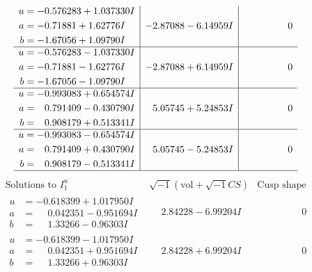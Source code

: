 \documentclass[1p]{elsarticle_modified}
\theoremstyle{definition}
\newcommand{\I}{\sqrt{-1}}
\begin{document}
$$\begin{array}{c|c|c}
\begin{aligned}
u &= -0.576283 + 1.037330 I \\
a &= -0.71881 + 1.62776 I \\
b &= -1.67056 + 1.09790 I\end{aligned}
 & -2.87088 - 6.14959 I & \phantom{-0.000000 } 0 \\ \hline\begin{aligned}
u &= -0.576283 - 1.037330 I \\
a &= -0.71881 - 1.62776 I \\
b &= -1.67056 - 1.09790 I\end{aligned}
 & -2.87088 + 6.14959 I & \phantom{-0.000000 } 0 \\ \hline\begin{aligned}
u &= -0.993083 + 0.654574 I \\
a &= \phantom{-}0.791409 - 0.430790 I \\
b &= \phantom{-}0.908179 + 0.513341 I\end{aligned}
 & \phantom{-}5.05745 + 5.24853 I & \phantom{-0.000000 } 0 \\ \hline\begin{aligned}
u &= -0.993083 - 0.654574 I \\
a &= \phantom{-}0.791409 + 0.430790 I \\
b &= \phantom{-}0.908179 - 0.513341 I\end{aligned}
 & \phantom{-}5.05745 - 5.24853 I & \phantom{-0.000000 } 0\\
 \hline 
 \end{array}$$\newpage$$\begin{array}{c|c|c}  
\text{Solutions to }I^u_{1}& \I (\text{vol} + \sqrt{-1}CS) & \text{Cusp shape}\\
 \hline 
\begin{aligned}
u &= -0.618399 + 1.017950 I \\
a &= \phantom{-}0.042351 - 0.951694 I \\
b &= \phantom{-}1.33266 - 0.96303 I\end{aligned}
 & \phantom{-}2.84228 - 6.99204 I & \phantom{-0.000000 } 0 \\ \hline\begin{aligned}
u &= -0.618399 - 1.017950 I \\
a &= \phantom{-}0.042351 + 0.951694 I \\
b &= \phantom{-}1.33266 + 0.96303 I\end{aligned}
 & \phantom{-}2.84228 + 6.99204 I & \phantom{-0.000000 } 0 \\ \hline\begin{aligned}

\end{aligned}
\end{array}$$
\end{document}
